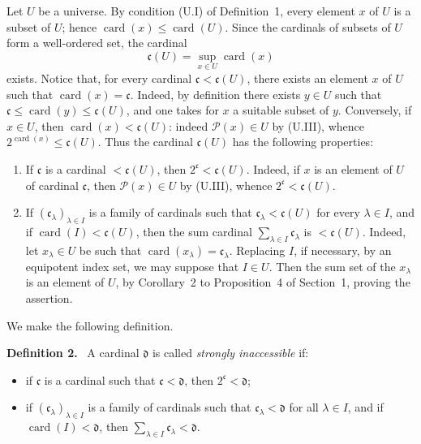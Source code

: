 \documentclass[11pt]{article}
\newcommand{\card}{\operatorname{card}}
\newcommand{\Pset}{\mathcal{P}}
\newenvironment{statement}[1]{\par\medskip\noindent\textbf{#1.}\ }{\par\medskip}
\begin{document}
Let \(U\) be a universe. By condition (U.I) of Definition~1, every element \(x\) of \(U\) is a subset of \(U\); hence \(\card(x)\leq\card(U)\). Since the cardinals of subsets of \(U\) form a well-ordered set, the cardinal
\begin{equation}
 \mathfrak c(U)=\sup_{x\in U}\card(x)
 \tag{1}
\end{equation}
exists. Notice that, for every cardinal \(\mathfrak c<\mathfrak c(U)\), there exists an element \(x\) of \(U\) such that \(\card(x)=\mathfrak c\). Indeed, by definition there exists \(y\in U\) such that \(\mathfrak c\leq\card(y)\leq\mathfrak c(U)\), and one takes for \(x\) a suitable subset of \(y\). Conversely, if \(x\in U\), then \(\card(x)<\mathfrak c(U)\): indeed \(\Pset(x)\in U\) by (U.III), whence \(2^{\card(x)}\leq\mathfrak c(U)\). Thus the cardinal \(\mathfrak c(U)\) has the following properties:
\begin{enumerate}[label=\arabic*)]
\item If \(\mathfrak c\) is a cardinal \(<\mathfrak c(U)\), then \(2^{\mathfrak c}<\mathfrak c(U)\). Indeed, if \(x\) is an element of \(U\) of cardinal \(\mathfrak c\), then \(\Pset(x)\in U\) by (U.III), whence \(2^{\mathfrak c}<\mathfrak c(U)\).
\item If \((\mathfrak c_\lambda)_{\lambda\in I}\) is a family of cardinals such that \(\mathfrak c_\lambda<\mathfrak c(U)\) for every \(\lambda\in I\), and if \(\card(I)<\mathfrak c(U)\), then the sum cardinal \(\sum_{\lambda\in I}\mathfrak c_\lambda\) is \(<\mathfrak c(U)\). Indeed, let \(x_\lambda\in U\) be such that \(\card(x_\lambda)=\mathfrak c_\lambda\). Replacing \(I\), if necessary, by an equipotent index set, we may suppose that \(I\in U\). Then the sum set of the \(x_\lambda\) is an element of \(U\), by Corollary~2 to Proposition~4 of Section~1, proving the assertion.
\end{enumerate}

We make the following definition.

\begin{statement}{Definition 2}
A cardinal \(\mathfrak d\) is called \emph{strongly inaccessible} if:
\begin{itemize}[leftmargin=4em]
\item[(FI.1)] if \(\mathfrak c\) is a cardinal such that \(\mathfrak c<\mathfrak d\), then \(2^{\mathfrak c}<\mathfrak d\);
\item[(FI.2)] if \((\mathfrak c_\lambda)_{\lambda\in I}\) is a family of cardinals such that \(\mathfrak c_\lambda<\mathfrak d\) for all \(\lambda\in I\), and if \(\card(I)<\mathfrak d\), then \(\sum_{\lambda\in I}\mathfrak c_\lambda<\mathfrak d\).
\end{itemize}
\end{statement}
\end{document}
